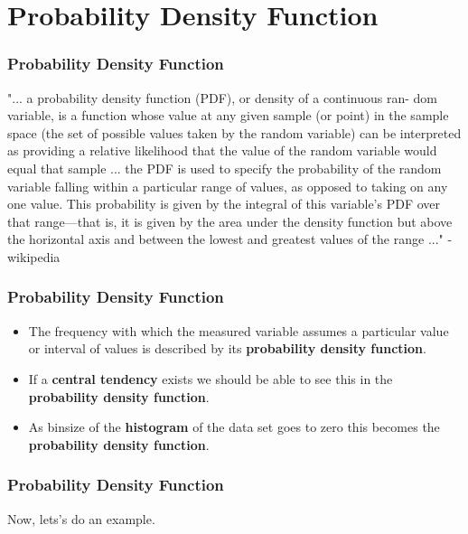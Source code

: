 \documentclass[fleqn]{beamer} %
\newcommand{\sectiontitleIV}{Probability Density Function}
\begin{document}
\section{\sectiontitleIV}	
	\begin{frame}[label=sectionIV] \small
		\frametitle{\sectiontitleIV}    

"... a {\BL probability density function (PDF)}, or density of a continuous ran-
dom variable, is a function whose value at any given sample (or point) in
the sample space (the set of possible values taken by the random variable)
can be interpreted as providing a relative likelihood that the value of the
random variable would equal that sample ... the PDF is used to specify
the probability of the random variable falling within a particular range of
values, as opposed to taking on any one value. This probability is given
by the integral of this variable’s PDF over that range—that is, it is given
by the area under the density function but above the horizontal axis and
between the lowest and greatest values of the range ..." - wikipedia

	\end{frame}
	
	\begin{frame}[label=sectionIV] \small
		\frametitle{\sectiontitleIV}    

			\begin{itemize}
			\item  The frequency with which the measured variable assumes a particular value or interval of values is described by its {\bf \BL probability density function}. \\

            \item  If a {\bf \PR central tendency} exists we should be able to see this in the {\bf \BL probability density function}. \\
                               
            \item  As binsize of the {\bf \GR histogram} of the data set goes to zero this becomes the {\bf \BL probability density function}. \\ 
                                
		\end{itemize}

	\end{frame}

	\begin{frame}[label=sectionIV] \small
		\frametitle{\sectiontitleIV}    
Now, lets's do an example.

	\end{frame}
\end{document}

